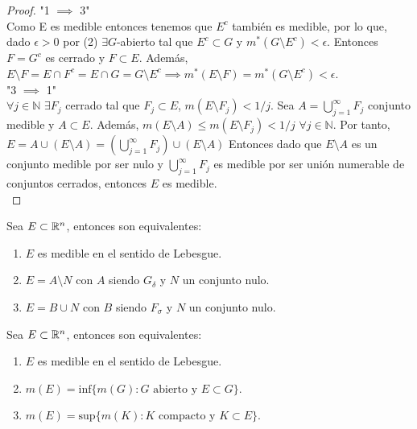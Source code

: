 \begin{proof}
    "1 $\implies$ 3"\\
    Como E es medible entonces tenemos que $E^c$ también es medible, por lo que, dado $\epsilon > 0$ por (2) $\exists G$-abierto tal que $E^c \subset G$ y $m^*(G \setminus E^c) < \epsilon$. Entonces $F = G^c$ es cerrado y $F \subset E$. Además, $E \setminus F = E \cap F^c = E \cap G = G \setminus E^c \implies m^*(E \setminus F) = m^*(G \setminus E^c) < \epsilon$.\\
    "3 $\implies$ 1"\\
    $\forall j \in \mathbb{N}$ $\exists F_j$ cerrado tal que $F_j \subset E$, $m(E \setminus F_j) < 1/j$. Sea $A = \bigcup_{j = 1}^{\infty} F_j$ conjunto medible y $A \subset E$. Además, $m(E \setminus A) \leq m(E \setminus F_j) < 1/j$ $\forall j \in \mathbb{N}$. Por tanto, $E = A \cup (E\setminus A) = (\bigcup_{j = 1}^{\infty}F_j) \cup (E\setminus A)$ Entonces dado que $E\setminus A$ es un conjunto medible por ser nulo y $\bigcup_{j = 1}^{\infty}F_j$ es medible por ser unión numerable de conjuntos cerrados, entonces $E$ es medible.\\ 

\end{proof}


\begin{corolario}
    Sea $E \subset \mathbb{R}^n$, entonces son equivalentes:
    \begin{enumerate}
        \item $E$ es medible en el sentido de Lebesgue.
        \item $E = A \setminus N$ con $A$ siendo $G_\delta$ y $N$ un conjunto nulo.
        \item $E = B \cup N$ con $B$ siendo $F_\sigma$ y $N$ un conjunto nulo.
    \end{enumerate}
\end{corolario}


\begin{corolario}
    Sea $E \subset \mathbb{R}^n$, entonces son equivalentes:
    \begin{enumerate}
        \item $E$ es medible en el sentido de Lebesgue.
        \item $m(E) = \text{inf}\{m(G) : G \text{ abierto y } E \subset G\}$.
        \item $m(E) = \text{sup}\{m(K) : K \text{ compacto y } K \subset E\}$.
    \end{enumerate}
\end{corolario}

